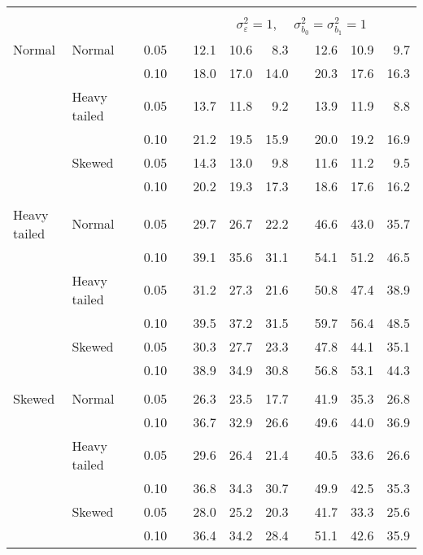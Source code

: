 \begin{table}[ht]
\begin{scriptsize}
\begin{tabular}{ll p{.1cm} c p{.1cm} rrr p{.1cm} rrr}
&&&&&&&&&&&\\
& && && \multicolumn{7}{c}{$\sigma_{\varepsilon}^2 = 1$, \ \ $\sigma_{b_0}^2 = \sigma_{b_1}^2 = 1$} \\ \cline{6-12}
\rowcolor{gray!20}  Normal & Normal &  & 0.05 &  & 12.1 & 10.6 & 8.3 &  & 12.6 & 10.9 & 9.7 \\ 
\rowcolor{gray!20}     &  &  & 0.10 &  & 18.0 & 17.0 & 14.0 &  & 20.3 & 17.6 & 16.3 \\ 
\rowcolor{gray!20}     & Heavy tailed &  & 0.05 &  & 13.7 & 11.8 & 9.2 &  & 13.9 & 11.9 & 8.8 \\ 
\rowcolor{gray!20}     &  &  & 0.10 &  & 21.2 & 19.5 & 15.9 &  & 20.0 & 19.2 & 16.9 \\ 
\rowcolor{gray!20}     & Skewed &  & 0.05 &  & 14.3 & 13.0 & 9.8 &  & 11.6 & 11.2 & 9.5 \\ 
\rowcolor{gray!20}     &  &  & 0.10 &  & 20.2 & 19.3 & 17.3 &  & 18.6 & 17.6 & 16.2 \\ 
&&&&&&&&&&&\\
  Heavy tailed & Normal &  & 0.05 &  & 29.7 & 26.7 & 22.2 &  & 46.6 & 43.0 & 35.7 \\ 
  &  &  & 0.10 &  & 39.1 & 35.6 & 31.1 &  & 54.1 & 51.2 & 46.5 \\ 
  & Heavy tailed &  & 0.05 &  & 31.2 & 27.3 & 21.6 &  & 50.8 & 47.4 & 38.9 \\ 
  &  &  & 0.10 &  & 39.5 & 37.2 & 31.5 &  & 59.7 & 56.4 & 48.5 \\ 
  & Skewed &  & 0.05 &  & 30.3 & 27.7 & 23.3 &  & 47.8 & 44.1 & 35.1 \\ 
  &  &  & 0.10 &  & 38.9 & 34.9 & 30.8 &  & 56.8 & 53.1 & 44.3 \\ 
&&&&&&&&&&&\\
  Skewed & Normal &  & 0.05 &  & 26.3 & 23.5 & 17.7 &  & 41.9 & 35.3 & 26.8 \\ 
   &  &  & 0.10 &  & 36.7 & 32.9 & 26.6 &  & 49.6 & 44.0 & 36.9 \\ 
   & Heavy tailed &  & 0.05 &  & 29.6 & 26.4 & 21.4 &  & 40.5 & 33.6 & 26.6 \\ 
   &  &  & 0.10 &  & 36.8 & 34.3 & 30.7 &  & 49.9 & 42.5 & 35.3 \\ 
   & Skewed &  & 0.05 &  & 28.0 & 25.2 & 20.3 &  & 41.7 & 33.3 & 25.6 \\ 
   &  &  & 0.10 &  & 36.4 & 34.2 & 28.4 &  & 51.1 & 42.6 & 35.9 \\ 



\end{tabular}
\end{scriptsize}
\end{table}
